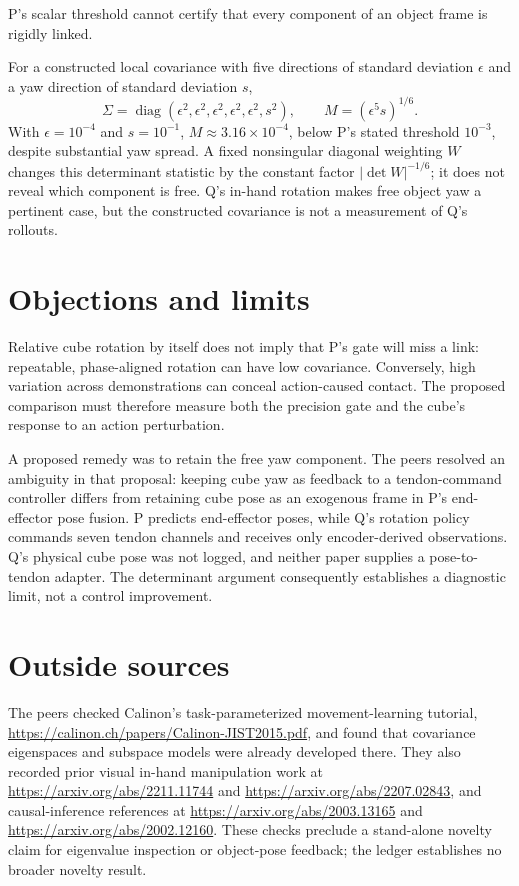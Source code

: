 \documentclass{article}
\begin{document}
\begin{claim}
P's scalar threshold cannot certify that every component of an object frame is rigidly linked.
\end{claim}
For a constructed local covariance with five directions of standard deviation \(\epsilon\) and a yaw direction of standard deviation \(s\),
\[
\Sigma=\operatorname{diag}(\epsilon^2,\epsilon^2,\epsilon^2,
                          \epsilon^2,\epsilon^2,s^2),
\qquad
M=(\epsilon^5s)^{1/6}.
\]
With \(\epsilon=10^{-4}\) and \(s=10^{-1}\), \(M\approx3.16\times10^{-4}\), below P's stated threshold \(10^{-3}\), despite substantial yaw spread. A fixed nonsingular diagonal weighting \(W\) changes this determinant statistic by the constant factor \(|\det W|^{-1/6}\); it does not reveal which component is free. Q's in-hand rotation makes free object yaw a pertinent case, but the constructed covariance is not a measurement of Q's rollouts. 

\section*{Objections and limits}

Relative cube rotation by itself does not imply that P's gate will miss a link: repeatable, phase-aligned rotation can have low covariance. Conversely, high variation across demonstrations can conceal action-caused contact. The proposed comparison must therefore measure both the precision gate and the cube's response to an action perturbation. 

A proposed remedy was to retain the free yaw component. The peers resolved an ambiguity in that proposal: keeping cube yaw as feedback to a tendon-command controller differs from retaining cube pose as an exogenous frame in P's end-effector pose fusion. P predicts end-effector poses, while Q's rotation policy commands seven tendon channels and receives only encoder-derived observations. Q's physical cube pose was not logged, and neither paper supplies a pose-to-tendon adapter. The determinant argument consequently establishes a diagnostic limit, not a control improvement. 

\section*{Outside sources}

The peers checked Calinon's task-parameterized movement-learning tutorial, \url{https://calinon.ch/papers/Calinon-JIST2015.pdf}, and found that covariance eigenspaces and subspace models were already developed there. They also recorded prior visual in-hand manipulation work at \url{https://arxiv.org/abs/2211.11744} and \url{https://arxiv.org/abs/2207.02843}, and causal-inference references at \url{https://arxiv.org/abs/2003.13165} and \url{https://arxiv.org/abs/2002.12160}. These checks preclude a stand-alone novelty claim for eigenvalue inspection or object-pose feedback; the ledger establishes no broader novelty result. 
\end{document}
